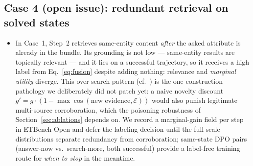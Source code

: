 \documentclass[letterpaper,twocolumn,10pt]{article}
\newcommand{\dataset}{ETBench-Open}
\begin{document}
\subsection*{Case 4 (open issue): redundant retrieval on solved states}
\begin{itemize}
\item In Case~1, Step~2 retrieves same-entity content \emph{after} the
asked attribute is already in the bundle. Its grounding is not low ---
same-entity results are topically relevant --- and it lies on a successful
trajectory, so it receives a high label from Eq.~\eqref{eq:fusion} despite
adding nothing: relevance and \emph{marginal utility} diverge. This
over-search pattern (cf.\ \citealt{hipragr2025}) is the one construction
pathology we deliberately did not patch yet: a naive novelty discount
$g' = g \cdot (1 - \max\cos(\text{new evidence}, \mathcal{E}))$ would also
punish legitimate multi-source corroboration, which the poisoning
robustness of Section~\ref{sec:ablations} depends on. We record a
marginal-gain field per step in \dataset{} and defer the labeling decision
until the full-scale distributions separate redundancy from corroboration;
same-state DPO pairs (answer-now vs.\ search-more, both successful)
provide a label-free training route for \emph{when to stop} in the
meantime.
\end{itemize}
\end{document}
